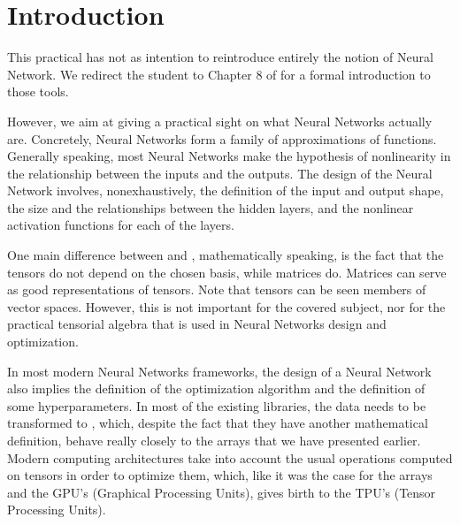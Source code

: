 \documentclass[letterpaper,10pt,english]{jupyterBook}
\begin{document}
\section{Introduction}
\label{\detokenize{04:introduction}}
\sphinxAtStartPar
This practical has not as intention to reintroduce entirely the notion of Neural Network. We redirect the student to Chapter 8 of  for a formal introduction to those tools.

\sphinxAtStartPar
However, we aim at giving a practical sight on what Neural Networks actually are. Concretely, Neural Networks form a family of approximations of functions. Generally speaking, most Neural Networks make the hypothesis of non\sphinxhyphen{}linearity in the relationship between the inputs and the outputs. The design of the Neural Network involves, non\sphinxhyphen{}exhaustively, the definition of the input and output shape, the size and the relationships between the hidden layers, and the non\sphinxhyphen{}linear activation functions for each of the layers.

\begin{sphinxShadowBox}
\sphinxstylesidebartitle{}

\sphinxAtStartPar
One main difference between  and , mathematically speaking, is the fact that the tensors do not depend on the chosen basis, while matrices do. Matrices can serve as good representations of tensors. Note that tensors can be seen members of vector spaces. However, this is not important for the covered subject, nor for the practical tensorial algebra that is used in Neural Networks design and optimization.
\end{sphinxShadowBox}

\sphinxAtStartPar
In most modern Neural Networks frameworks, the design of a Neural Network also implies the definition of the optimization algorithm and the definition of some hyperparameters. In most of the existing libraries, the data needs to be transformed to , which, despite the fact that they have another mathematical definition, behave really closely to the  arrays that we have presented earlier. Modern computing architectures take into account the usual operations computed on tensors in order to optimize them, which, like it was the case for the arrays and the GPU’s (Graphical Processing Units), gives birth to the TPU’s (Tensor Processing Units).
\end{document}
